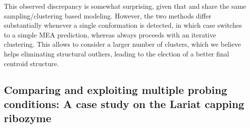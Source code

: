\documentclass[a4,center,fleqn]{NAR}
\begin{document}



This observed discrepancy is somewhat surprising, given that \OurTool and  share the same sampling/clustering based modeling. However, the two methods differ substantially whenever a single conformation is detected, in which case  switches to a simple MEA prediction, whereas \OurTool{} always proceeds with an iterative clustering. This allows \OurTool{} to consider a larger number of clusters, which we believe helps eliminating structural outliers, leading to the election of a better final centroid structure. 




\subsection*{Comparing and exploiting multiple probing conditions: A case study on the Lariat capping ribozyme}

\newcommand{\Bull}[1]{{\sffamily #1}~\raisebox{1pt}{\tikzcircle[black, fill=cluster#1]{3pt}}}

\newcommand{\BullLab}[1]{Cluster \Bull{#1}}

\end{document}
